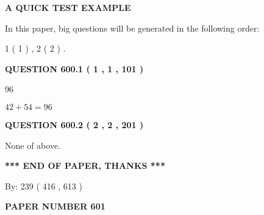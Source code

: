 \documentclass[12pt]{article}
\begin{document}
   
 \vspace{0.2in}
{\LARGE {\textbf{ A QUICK TEST EXAMPLE}}}
   
   
   
\vspace{0.2in}
   
In this paper, big questions will be generated in the following order: 
   
   
   1 ( 1 )
 ,
   2 ( 2 )
 .
  
\vspace{0.2in}
  
{\textbf{\Large{QUESTION
600.1 
 ( 1 , 1 , 101 )
}}}
  
  
 
 
\noindent{}

96
 
 
 
 
\noindent{}

$ %
42 +  %
54=   %
96$
 
 
  
\vspace{0.2in}
  
{\textbf{\Large{QUESTION
600.2 
 ( 2 , 2 , 201 )
}}}
  
  
 
 
\noindent{}
 
 
 None of above.
 
 
 
 
   
   
 \vspace{0.2in}
 
   
   
   
   
\vspace{1.0in} 
{\textbf{\large{ *** END OF PAPER, THANKS *** }}} 
   
   
\hspace{1.0in} By: 
 239 ( 416 ,  613 )
   
   
   
   
\newpage 
\setcounter{page}{ 
   601001 } 
   
   
   
   
 {\textbf{ \Large{ PAPER NUMBER  601  }}}
   
   
\vspace{0.2in}
   
\end{document}
